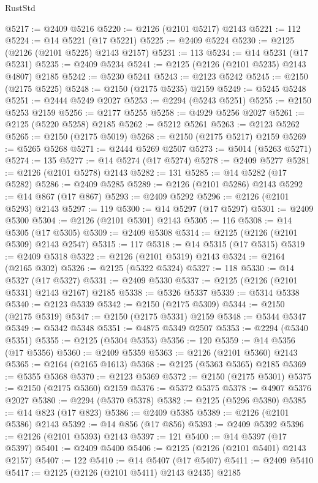 \begin{lexlean}{RustStd}
\begin{coremodule}
@5217 := @2409 @5216
@5220 := @2126 (@2101 @5217) @2143
@5221 := 112
@5224 := @14 @5221 (@17 @5221)
@5225 := @2409 @5224
@5230 := @2125 (@2126 (@2101 @5225) @2143 @2157)
@5231 := 113
@5234 := @14 @5231 (@17 @5231)
@5235 := @2409 @5234
@5241 := @2125 (@2126 (@2101 @5235) @2143 @4807) @2185
@5242 := @5230 @5241
@5243 := @2123 @5242
@5245 := @2150 (@2175 @5225)
@5248 := @2150 (@2175 @5235) @2159
@5249 := @5245 @5248
@5251 := @2444 @5249 @2027
@5253 := @2294 (@5243 @5251)
@5255 := @2150 @5253 @2159
@5256 := @2177 @5255
@5258 := @4929 @5256 @2027
@5261 := @2125 (@5220 @5258) @2185
@5262 := @5212 @5261
@5263 := @2123 @5262
@5265 := @2150 (@2175 @5019)
@5268 := @2150 (@2175 @5217) @2159
@5269 := @5265 @5268
@5271 := @2444 @5269 @2507
@5273 := @5014 (@5263 @5271)
@5274 := 135
@5277 := @14 @5274 (@17 @5274)
@5278 := @2409 @5277
@5281 := @2126 (@2101 @5278) @2143
@5282 := 131
@5285 := @14 @5282 (@17 @5282)
@5286 := @2409 @5285
@5289 := @2126 (@2101 @5286) @2143
@5292 := @14 @867 (@17 @867)
@5293 := @2409 @5292
@5296 := @2126 (@2101 @5293) @2143
@5297 := 119
@5300 := @14 @5297 (@17 @5297)
@5301 := @2409 @5300
@5304 := @2126 (@2101 @5301) @2143
@5305 := 116
@5308 := @14 @5305 (@17 @5305)
@5309 := @2409 @5308
@5314 := @2125 (@2126 (@2101 @5309) @2143 @2547)
@5315 := 117
@5318 := @14 @5315 (@17 @5315)
@5319 := @2409 @5318
@5322 := @2126 (@2101 @5319) @2143
@5324 := @2164 (@2165 @302)
@5326 := @2125 (@5322 @5324)
@5327 := 118
@5330 := @14 @5327 (@17 @5327)
@5331 := @2409 @5330
@5337 := @2125 (@2126 (@2101 @5331) @2143 @2167) @2185
@5338 := @5326 @5337
@5339 := @5314 @5338
@5340 := @2123 @5339
@5342 := @2150 (@2175 @5309)
@5344 := @2150 (@2175 @5319)
@5347 := @2150 (@2175 @5331) @2159
@5348 := @5344 @5347
@5349 := @5342 @5348
@5351 := @4875 @5349 @2507
@5353 := @2294 (@5340 @5351)
@5355 := @2125 (@5304 @5353)
@5356 := 120
@5359 := @14 @5356 (@17 @5356)
@5360 := @2409 @5359
@5363 := @2126 (@2101 @5360) @2143
@5365 := @2164 (@2165 @1613)
@5368 := @2125 (@5363 @5365) @2185
@5369 := @5355 @5368
@5370 := @2123 @5369
@5372 := @2150 (@2175 @5301)
@5375 := @2150 (@2175 @5360) @2159
@5376 := @5372 @5375
@5378 := @4907 @5376 @2027
@5380 := @2294 (@5370 @5378)
@5382 := @2125 (@5296 @5380)
@5385 := @14 @823 (@17 @823)
@5386 := @2409 @5385
@5389 := @2126 (@2101 @5386) @2143
@5392 := @14 @856 (@17 @856)
@5393 := @2409 @5392
@5396 := @2126 (@2101 @5393) @2143
@5397 := 121
@5400 := @14 @5397 (@17 @5397)
@5401 := @2409 @5400
@5406 := @2125 (@2126 (@2101 @5401) @2143 @2157)
@5407 := 122
@5410 := @14 @5407 (@17 @5407)
@5411 := @2409 @5410
@5417 := @2125 (@2126 (@2101 @5411) @2143 @2435) @2185

\end{coremodule}
\end{lexlean}
